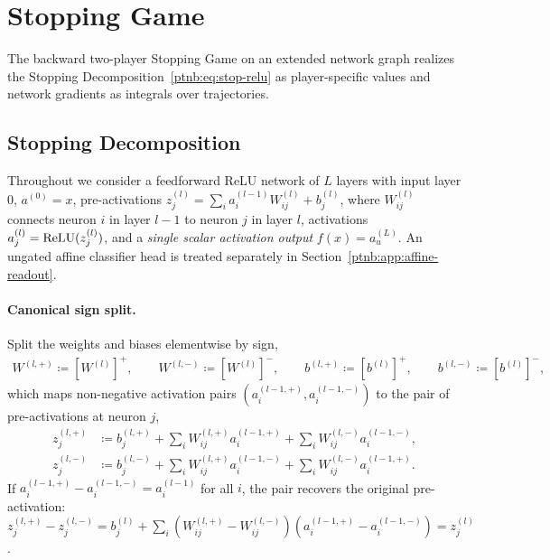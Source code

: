 \section{Stopping Game}\label{ptnb:app:relu-net-game}\label{ptnb:app:adf-game}

The backward two-player Stopping Game on an extended network graph realizes the Stopping
Decomposition~\eqref{ptnb:eq:stop-relu} as player-specific values and network gradients as integrals over
trajectories.

\subsection{Stopping Decomposition}\label{ptnb:app:dc-decomp}\label{ptnb:app:decompositions}

Throughout we consider a feedforward ReLU network of $L$ layers with input layer $0$, $a^{(0)} =
    x$, pre-activations $z_j^{(l)} = \sum_i a_i^{(l-1)} W_{ij}^{(l)} + b_j^{(l)}$, where $W_{ij}^{(l)}$
connects neuron $i$ in layer $l-1$ to neuron $j$ in layer $l$, activations $a_j^{(l)} =
    \text{ReLU}(z_j^{(l)})$, and a \emph{single scalar activation output} $f(x) = a_u^{(L)}$.
An ungated affine classifier head is treated separately in Section~\ref{ptnb:app:affine-readout}.

\paragraph{Canonical sign split.}
Split the weights and biases elementwise by sign,
\begin{align}
    W^{(l,+)} \coloneqq [W^{(l)}]^+, \qquad W^{(l,-)} \coloneqq [W^{(l)}]^-, \qquad b^{(l,+)} \coloneqq
    [b^{(l)}]^+, \qquad b^{(l,-)} \coloneqq [b^{(l)}]^-,
\end{align}
which maps non-negative activation pairs $(a_i^{(l-1,+)}, a_i^{(l-1,-)})$ to the pair of
pre-activations at neuron $j$,
\begin{align}
    z_j^{(l,+)} &\coloneqq b_j^{(l,+)} + \sum_i W_{ij}^{(l,+)} a_i^{(l-1,+)} + \sum_i W_{ij}^{(l,-)}
    a_i^{(l-1,-)}, \label{ptnb:eq:split-pos}\\
    z_j^{(l,-)} &\coloneqq b_j^{(l,-)} + \sum_i W_{ij}^{(l,+)} a_i^{(l-1,-)} + \sum_i W_{ij}^{(l,-)}
    a_i^{(l-1,+)}. \label{ptnb:eq:split-neg}
\end{align}
If $a_i^{(l-1,+)} - a_i^{(l-1,-)} = a_i^{(l-1)}$ for all $i$, the pair recovers the original pre-activation:
$z_j^{(l,+)} - z_j^{(l,-)} = b_j^{(l)} + \sum_i (W_{ij}^{(l,+)} - W_{ij}^{(l,-)}) (a_i^{(l-1,+)} -
    a_i^{(l-1,-)}) = z_j^{(l)}$.

